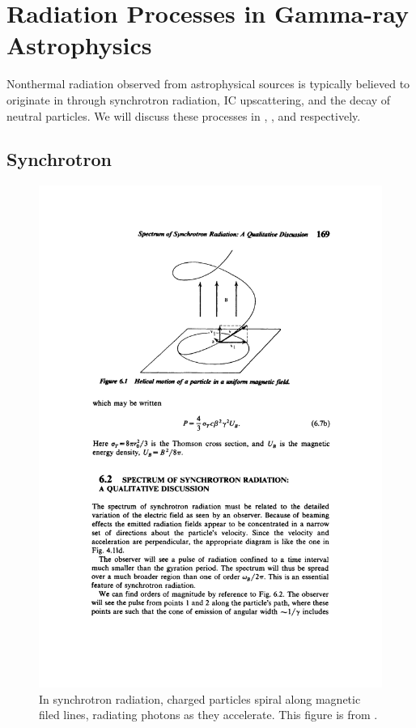 \section{Radiation Processes in Gamma-ray Astrophysics}

Nonthermal radiation observed from astrophysical sources is
typically believed to originate in through synchrotron radiation, \ac{IC}
upscattering, and the
decay of neutral \pion particles.  We will discuss these processes
in , , and
 respectively.

\subsection{Synchrotron}

\begin{figure}[htbp]
  \centering 
    \includegraphics{chapters/introduction/figures/syncrotron_radiation_spiral.pdf}
    \caption{In synchrotron radiation, charged particles spiral along
      magnetic filed lines, radiating photons as they accelerate.
	This figure is from \cite{rybicki_1979a_radiative-processes}.
    }
\end{figure}



